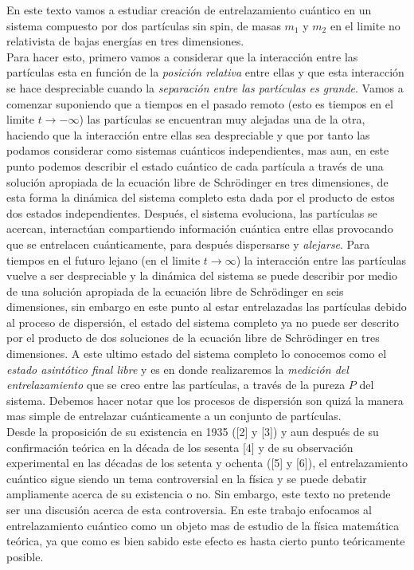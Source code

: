 \documentclass[12pt]{book}
\numberwithin{equation}{chapter}
\def\rar{\rightarrow}
\begin{document}
En este texto vamos a estudiar creaci\'on de entrelazamiento cu\'antico en un sistema compuesto por dos part\'iculas sin spin, de masas $m_{1}$ y $m_{2}$ en el limite no relativista de bajas energ\'ias en tres dimensiones.\\ 
Para hacer esto, primero vamos a considerar que la interacci\'on entre las part\'iculas esta en funci\'on de la \emph{posici\'on relativa} entre ellas y que esta interacci\'on se hace despreciable cuando la \emph{separaci\'on entre las part\'iculas es grande}. Vamos a comenzar suponiendo que a tiempos en el pasado remoto (esto es tiempos en el limite $t \rar -\infty$) las part\'iculas se encuentran muy alejadas una de la otra, haciendo que la interacci\'on entre ellas sea despreciable y que por tanto las podamos considerar como sistemas cu\'anticos independientes, mas aun, en este punto podemos describir el estado cu\'antico de cada part\'icula a trav\'es de una soluci\'on apropiada de la ecuaci\'on libre de Schr\"odinger en tres dimensiones, de esta forma la din\'amica del sistema completo esta dada por el producto de estos dos estados independientes. Despu\'es, el sistema evoluciona, las part\'iculas se acercan, interact\'uan compartiendo informaci\'on cu\'antica entre ellas provocando que se entrelacen cu\'anticamente, para despu\'es dispersarse y \emph{alejarse}. Para tiempos en el futuro lejano (en el limite $t \rar \infty$) la interacci\'on entre las part\'iculas vuelve a ser despreciable y la din\'amica del sistema se puede describir por medio de una soluci\'on apropiada de la ecuaci\'on libre de Schr\"odinger en seis dimensiones, sin embargo en este punto al estar entrelazadas las part\'iculas debido al proceso de dispersi\'on, el estado del sistema completo ya no puede ser descrito por el producto de dos soluciones de la ecuaci\'on libre de Schr\"odinger en tres dimensiones. A este ultimo estado del sistema completo lo conocemos como el \emph{estado asint\'otico final libre} y es en donde realizaremos la \emph{medici\'on del entrelazamiento} que se creo entre las part\'iculas, a trav\'es de la pureza $P$ del sistema. Debemos hacer notar que los procesos de dispersi\'on son quiz\'a la manera mas simple de entrelazar cu\'anticamente a un conjunto de part\'iculas.\\

Desde la proposici\'on de su existencia en 1935 ([2] y [3]) y aun despu\'es de su confirmaci\'on te\'orica en la d\'ecada de los sesenta [4] y de su observaci\'on experimental en las d\'ecadas de los setenta y ochenta ([5] y [6]), el entrelazamiento cu\'antico sigue siendo un tema controversial en la f\'isica y se puede debatir ampliamente acerca de su existencia o no. Sin embargo, este texto no pretende ser una discusi\'on acerca de esta controversia. En este trabajo enfocamos al entrelazamiento cu\'antico como un objeto mas de estudio de la f\'isica matem\'atica te\'orica, ya que como es bien sabido este efecto es hasta cierto punto te\'oricamente posible.\\
\end{document}
